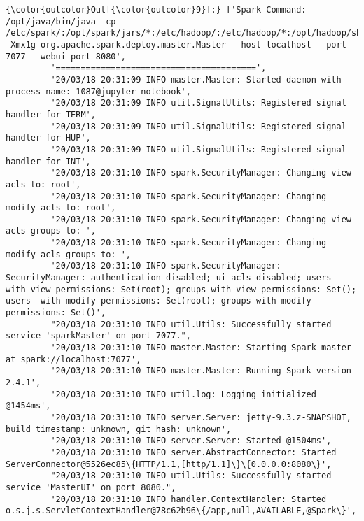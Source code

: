 \documentclass[11pt]{article}
\begin{document}
\begin{Verbatim}[commandchars=\\\{\}]
{\color{outcolor}Out[{\color{outcolor}9}]:} ['Spark Command: /opt/java/bin/java -cp /etc/spark/:/opt/spark/jars/*:/etc/hadoop/:/etc/hadoop/*:/opt/hadoop/share/hadoop/common/lib/*:/opt/hadoop/share/hadoop/common/*:/opt/hadoop/share/hadoop/hdfs/*:/opt/hadoop/share/hadoop/hdfs/lib/*:/opt/hadoop/share/hadoop/yarn/lib/*:/opt/hadoop/share/hadoop/yarn/*:/opt/hadoop/share/hadoop/mapreduce/lib/*:/opt/hadoop/share/hadoop/mapreduce/*:/opt/hadoop/share/hadoop/tools/lib/* -Xmx1g org.apache.spark.deploy.master.Master --host localhost --port 7077 --webui-port 8080',
         '========================================',
         '20/03/18 20:31:09 INFO master.Master: Started daemon with process name: 1087@jupyter-notebook',
         '20/03/18 20:31:09 INFO util.SignalUtils: Registered signal handler for TERM',
         '20/03/18 20:31:09 INFO util.SignalUtils: Registered signal handler for HUP',
         '20/03/18 20:31:09 INFO util.SignalUtils: Registered signal handler for INT',
         '20/03/18 20:31:10 INFO spark.SecurityManager: Changing view acls to: root',
         '20/03/18 20:31:10 INFO spark.SecurityManager: Changing modify acls to: root',
         '20/03/18 20:31:10 INFO spark.SecurityManager: Changing view acls groups to: ',
         '20/03/18 20:31:10 INFO spark.SecurityManager: Changing modify acls groups to: ',
         '20/03/18 20:31:10 INFO spark.SecurityManager: SecurityManager: authentication disabled; ui acls disabled; users  with view permissions: Set(root); groups with view permissions: Set(); users  with modify permissions: Set(root); groups with modify permissions: Set()',
         "20/03/18 20:31:10 INFO util.Utils: Successfully started service 'sparkMaster' on port 7077.",
         '20/03/18 20:31:10 INFO master.Master: Starting Spark master at spark://localhost:7077',
         '20/03/18 20:31:10 INFO master.Master: Running Spark version 2.4.1',
         '20/03/18 20:31:10 INFO util.log: Logging initialized @1454ms',
         '20/03/18 20:31:10 INFO server.Server: jetty-9.3.z-SNAPSHOT, build timestamp: unknown, git hash: unknown',
         '20/03/18 20:31:10 INFO server.Server: Started @1504ms',
         '20/03/18 20:31:10 INFO server.AbstractConnector: Started ServerConnector@5526ec85\{HTTP/1.1,[http/1.1]\}\{0.0.0.0:8080\}',
         "20/03/18 20:31:10 INFO util.Utils: Successfully started service 'MasterUI' on port 8080.",
         '20/03/18 20:31:10 INFO handler.ContextHandler: Started o.s.j.s.ServletContextHandler@78c62b96\{/app,null,AVAILABLE,@Spark\}',

\end{Verbatim}
\end{document}
